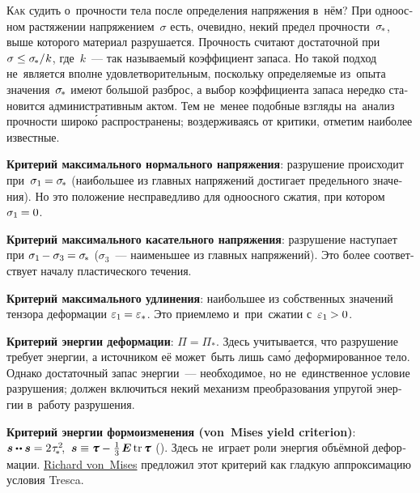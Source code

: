 \begin{otherlanguage}{russian}

\lettrine[lines=2, findent=2pt, nindent=0pt]{К}{ак} судить о~прочности тела после определения напряжения в~нём? При одноосном растяжении напряжением~$\sigma$ есть, очевидно, некий предел прочности~${\sigma_{\hspace{-0.25ex}*}}$, выше которого материал разрушается. Прочность считают достаточной при~${\sigma \leq \sigma_{\hspace{-0.25ex}*} / \hspace{.1ex} k}$, где~$k$~--- так называемый коэффициент запаса. Но такой подход не~является вполне удовлетворительным, поскольку определяемые из~опыта значения~${\sigma_{\hspace{-0.25ex}*}}$ имеют большой разброс, а выбор коэффициента запаса нередко становится административным актом. Тем не~менее подобные взгляды на~анализ прочности широк\'{о} распространены; воздерживаясь от критики, отметим наиболее известные.

\textbf{Критерий максимального нормального напряжения}: разрушение происходит при~${\sigma_1 \hspace{-0.12ex} = \sigma_{\hspace{-0.25ex}*}}$ (наибольшее из главных напряжений достигает предельного значения). Но это положение несправедливо для одноосного сжатия, при котором ${\sigma_1 \hspace{-0.12ex} = 0}$.

\textbf{Критерий максимального касательного напряжения}: разрушение наступает при ${\sigma_1 \hspace{-0.16ex} - \sigma_3 \hspace{-0.1ex} = \sigma_{\hspace{-0.25ex}*}}$ ($\sigma_3$~--- наименьшее из главных напряжений). Это более соответствует началу пластического течения.

\textbf{Критерий максимального удлинения}: наибольшее из собственных значений тензора деформации ${\varepsilon_1 \hspace{-0.12ex} = \varepsilon_*}$. Это приемлемо и~при~сжатии с~${\varepsilon_1 \hspace{-0.12ex} > 0}$.

\textbf{Критерий энергии деформации}: ${\Pi = \Pi_*}$. Здесь учитывается, что разрушение требует энергии, а источником её может~быть лишь сам\'{о} деформированное тело. Однако достаточный запас энергии~--- необходимое, но не~единственное условие разрушения; должен включиться некий механизм преобразования упругой энергии в~работу разрушения.

\textbf{Критерий энергии формоизменения (von~Mises yield criterion)}: ${\stressdeviator \dotdotp \stressdeviator = 2 \hspace{.12ex} \tau_{\!*}^2\hspace{-0.5ex}}$, ${\, \stressdeviator \equiv \mathboldtau - \frac{1}{3} \hspace{.25ex} \bm{E} \operatorname{tr} \mathboldtau}$ (). Здесь не~играет роли энергия объёмной деформации.
\href{https://en.wikipedia.org/wiki/Richard_von_Mises}{Richard von~Mises} предложил этот критерий как гладкую аппроксимацию условия Tresca.


\end{otherlanguage}
